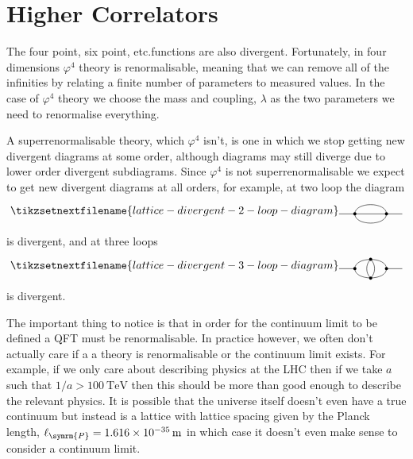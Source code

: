 \documentclass[fleqn]{NotesClass}
\begin{document}
    \section{Higher Correlators}
    The four point, six point, etc.\@ functions are also divergent.
    Fortunately, in four dimensions \(\varphi^4\) theory is renormalisable, meaning that we can remove all of the infinities by relating a finite number of parameters to measured values.
    In the case of \(\varphi^4\) theory we choose the mass and coupling, \(\lambda\) as the two parameters we need to renormalise everything.
    
    A superrenormalisable theory, which \(\varphi^4\) isn't, is one in which we stop getting new divergent diagrams at some order, although diagrams may still diverge due to lower order divergent subdiagrams.
    Since \(\varphi^4\) is not superrenormalisable we expect to get new divergent diagrams at all orders, for example, at two loop the diagram
    \begin{equation}
        \tikzsetnextfilename{lattice-divergent-2-loop-diagram}
        \begin{tikzpicture}[baseline=(current bounding box)]
            \draw (0, 0) -- (2, 0);
            \draw (0.5, 0) to [out=90, in=90] (1.5, 0);
            \draw (0.5, 0) to [out=-90, in=-90] (1.5, 0);
            \fill (0.5, 0) circle [radius=0.05];
            \fill (1.5, 0) circle [radius=0.05];
        \end{tikzpicture}
    \end{equation}
    is divergent, and at three loops
    \begin{equation}
        \tikzsetnextfilename{lattice-divergent-3-loop-diagram}
        \begin{tikzpicture}[baseline=(current bounding box)]
            \draw (0, 0) -- (0.5, 0);
            \draw (1.5, 0) -- (2, 0);
            \draw (0.5, 0) to [out=90, in=90] (1.5, 0);
            \draw (0.5, 0) to [out=-90, in=-90] (1.5, 0);
            \coordinate (A) at (1, 0.3);
            \coordinate (B) at (1, -0.3);
            \draw (A) to [out=225, in=135] (B);
            \draw (A) to [out=315, in=45] (B);
            \fill (0.5, 0) circle [radius=0.05];
            \fill (1.5, 0) circle [radius=0.05];
            \fill (A) circle [radius=0.05];
            \fill (B) circle [radius=0.05];
        \end{tikzpicture}
    \end{equation}
    is divergent.
    
    The important thing to notice is that in order for the continuum limit to be defined a QFT must be renormalisable.
    In practice however, we often don't actually care if a a theory is renormalisable or the continuum limit exists.
    For example, if we only care about describing physics at the LHC then if we take \(a\) such that \(1/a > \qty{100}{\tera\electronvolt}\) then this should be more than good enough to describe the relevant physics.
    It is possible that the universe itself doesn't even have a true continuum but instead is a lattice with lattice spacing given by the Planck length, \(\ell_{\symrm{P}} = \qty{1.616e-35}{\metre}\) in which case it doesn't even make sense to consider a continuum limit.
    
\end{document}
